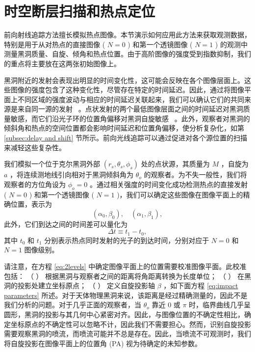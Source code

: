 \documentclass[aps,reprint,superscriptaddress,nofootinbib,floatfix,longbibliography,preprintnumbers]{revtex4-1}
\begin{document}
   \section{时空断层扫描和热点定位  }    
   \label{sec:tomography}    前向射线追踪方法擅长模拟热点图像。本节演示如何应用此方法来获取观测数据，特别是用于从对热点的直接图像 (    $N=0$    ) 和第一个透镜图像 (    $N=1$    ) 的观测中测量黑洞质量、自旋、倾角和热点位置。由于高阶图像的强度受到指数抑制，我们的重点将主要放在这两张初始图像上。  

黑洞附近的发射会表现出明显的时间变化性，这可能会反映在各个图像层面上。这些图像的强度包含了这种变化性，尽管存在特定的时间延迟。因此，通过将图像平面上不同区域的强度波动与相应的时间延迟关联起来，我们可以确认它们的共同来源是来自同一源的发射~    \cite{Hadar:2020fda}    。点状发射的两个最低图像层面之间的时间延迟对黑洞质量敏感，而它们沿光子环的位置角偏移对黑洞自旋敏感~    \cite{Gralla:2019drh,Hadar:2020fda,Andrianov:2022snn}    。此外，观察者对黑洞的倾斜角和热点的空间位置都会影响时间延迟和位置角偏移，使分析复杂化，如第~    \ref{subsec:delay and shift}    节所示。前向光线追踪可以通过促进对各个源位置的扫描来减轻这些复杂性。  

我们模拟一个位于克尔黑洞外部    $(r_s,\theta_s,\phi_s)$    处的点状源，其质量为    $M$   ，自旋为    $a$   ，将连续测地线引向相对于黑洞倾斜角为    $\theta_o$    的观察者。为不失一般性，我们将观察者的方位角设为    $\phi_o = 0$   。通过相关强度的时间变化成功检测热点的直接发射 (    $N=0$    ) 和第一个透镜图像 (    $N=1$    )，我们可以确定这些图像在图像平面上的精确位置，表示为
   \begin{equation}
    (\alpha_0, \beta_0),\quad (\alpha_1, \beta_1),\label{eq:2levels}
\end{equation}    此外，它们到达之间的时间差可以量化为
   \begin{equation}
    \Delta t \equiv t_1 - t_0,\label{eq:2levelst}
\end{equation}    其中    $t_0$    和    $t_1$    分别表示热点同时发射的光子的到达时间，分别对应于    $N=0$    和    $N=1$    图像级别。  

请注意，在方程    \ref{eq:2levels}    中确定图像平面上的位置需要校准图像平面。此校准包括： { （   ）   }  根据黑洞与观察者之间的距离将角距离转换为长度单位； { （   ）   }  在黑洞的投影处建立坐标原点； { （   ）   }  定义自旋投影轴    $\beta$    ，如下面方程    \ref{eq:impact parameters}    所述。对于天体物理黑洞来说，该距离是经过精确测量的，因此不是我们分析的问题。对于几乎正面的观察者，当    $\theta_o$    靠近    $0$    或    $\pi$    时，临界曲线几乎呈圆形，黑洞的投影与其几何中心紧密对齐。因此，与图像位置的不确定性相比，确定坐标原点的不确定性可以忽略不计，因此我们不需要担心。然而，识别自旋投影需要观察黑洞的喷流，而喷流可能并不总是存在。因此，当喷流不可观测时，我们将自旋投影在图像平面上的位置角 (PA) 视为待确定的未知参数。  
\end{document}
